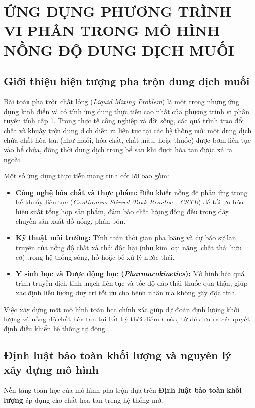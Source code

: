 \documentclass[14pt]{extarticle}
\begin{document}
\section{ỨNG DỤNG PHƯƠNG TRÌNH VI PHÂN TRONG MÔ HÌNH NỒNG ĐỘ DUNG DỊCH MUỐI}

\subsection{Giới thiệu hiện tượng pha trộn dung dịch muối}
Bài toán pha trộn chất lỏng (\textit{Liquid Mixing Problem}) là một trong những ứng dụng kinh điển và có tính ứng dụng thực tiễn cao nhất của phương trình vi phân tuyến tính cấp 1. Trong thực tế công nghiệp và đời sống, các quá trình trao đổi chất và khuấy trộn dung dịch diễn ra liên tục tại các hệ thống mở: một dung dịch chứa chất hòa tan (như muối, hóa chất, chất màu, hoặc thuốc) được bơm liên tục vào bể chứa, đồng thời dung dịch trong bể sau khi được hòa tan được xả ra ngoài.

Một số ứng dụng thực tiễn mang tính cốt lõi bao gồm:
\begin{itemize}
    \item \textbf{Công nghệ hóa chất và thực phẩm:} Điều khiển nồng độ phản ứng trong bể khuấy liên tục (\textit{Continuous Stirred-Tank Reactor - CSTR}) để tối ưu hóa hiệu suất tổng hợp sản phẩm, đảm bảo chất lượng đồng đều trong dây chuyền sản xuất đồ uống, phân bón.
    \item \textbf{Kỹ thuật môi trường:} Tính toán thời gian pha loãng và dự báo sự lan truyền của nồng độ chất xả thải độc hại (như kim loại nặng, chất thải hữu cơ) trong hệ thống sông, hồ hoặc bể xử lý nước thải.
    \item \textbf{Y sinh học và Dược động học (\textit{Pharmacokinetics}):} Mô hình hóa quá trình truyền dịch tĩnh mạch liên tục và tốc độ đảo thải thuốc qua thận, giúp xác định liều lượng duy trì tối ưu cho bệnh nhân mà không gây độc tính.
\end{itemize}

Việc xây dựng một mô hình toán học chính xác giúp dự đoán định lượng khối lượng và nồng độ chất hòa tan tại bất kỳ thời điểm $t$ nào, từ đó đưa ra các quyết định điều khiển hệ thống tự động.

\subsection{Định luật bảo toàn khối lượng và nguyên lý xây dựng mô hình}
Nền tảng toán học của mô hình pha trộn dựa trên \textbf{Định luật bảo toàn khối lượng} áp dụng cho chất hòa tan trong hệ thống mở.
\end{document}
